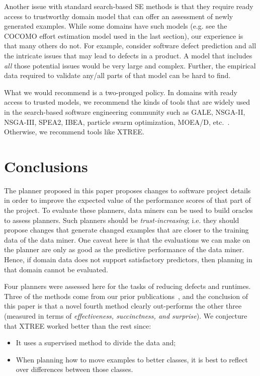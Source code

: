 \documentclass{sig-alternate}
\newcommand{\bi}{\begin{itemize}}
\newcommand{\ei}{\end{itemize}}
\begin{document}
Another issue with standard search-based SE methods is that they require ready access to 
trustworthy domain model that can offer an assessment
of newly generated examples. While some domains have such models (e.g. see the COCOMO effort estimation model
used in the last section), our experience is that many others do not.  For example, 
consider software defect prediction and all the intricate issues that may lead to defects in a product. A model that includes {\em all} those
potential issues would be very large and complex. Further,
the empirical data required to validate any/all parts
of that model can be hard to find.

What we would recommend is a two-pronged policy.
In domains with ready access to trusted models, we recommend
the kinds of tools that are widely used in the search-based
software engineering community such as GALE, NSGA-II, NSGA-III, SPEA2, IBEA, particle swarm optimization, MOEA/D, etc.~\cite{krall14,deb00a,zit02,zit04,%
deb14,Cui2005a,zhang07:TEC}. Otherwise, we recommend tools like XTREE.

\section{Conclusions}

The planner proposed in this paper proposes changes to software project details in order to improve the expected
value of the performance scores of that part of the project.
To evaluate these planners,
data miners can be used to build oracles to assess planners.
Such planners should be {\em trust-increasing}; i.e. they should propose changes that generate
changed examples that are closer to the training data of the data miner.
One caveat here is that the evaluations we can make on the planner are only as good as the predictive
performance of the data miner. Hence, if domain data does not support satisfactory predictors, then
planning in that domain cannot be evaluated.

Four planners were assessed here for the tasks of reducing defects and runtimes. 
Three of the methods come from our prior publications~\cite{me12c,krishna15}, and the conclusion of this
paper is that a novel fourth method clearly out-performs the other three
(measured in terms of {\em effectiveness, succinctness, and surprise}).
We conjecture that XTREE worked better than the rest since:
\bi
\item
It uses a supervised method to divide the data and;
\item
When planning how to move examples to better classes, it is best to reflect over 
differences between those classes.
\ei
\end{document}
